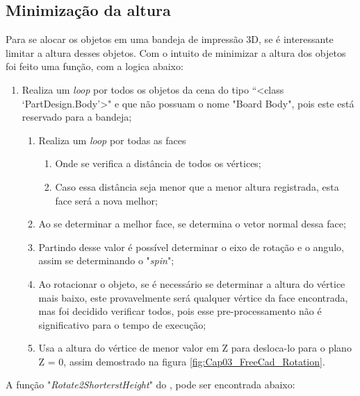 \subsection{Minimização da altura}
Para se alocar os objetos em uma bandeja de impressão 3D, se é interessante limitar a altura desses objetos.\newline
Com o intuito de minimizar a altura dos objetos foi feito uma função, com a logica abaixo: 
\begin{enumerate}
    \item Realiza um \textit{loop} por todos os objetos da cena do tipo ``<class `PartDesign.Body'>" e que não possuam o nome "Board Body", pois este está reservado para a bandeja;
    \begin{enumerate}
        \item Realiza um \textit{loop} por todas as faces
        \begin{enumerate}
            \item Onde se verifica a distância de todos os vértices;
            \item Caso essa distância seja menor que a menor altura registrada, esta face será a nova melhor;
        \end{enumerate}
        \item Ao se determinar a melhor face, se determina o vetor normal dessa face;
        \item Partindo desse valor é possível determinar o eixo de rotação e o angulo, assim se determinando o "\textit{spin}";
        \item Ao rotacionar o objeto, se é necessário se determinar a altura do vértice mais baixo, este provavelmente será qualquer vértice da face encontrada, mas foi decidido verificar todos, pois esse pre-processamento não é significativo para o tempo de execução;
        \item Usa a altura do vértice de menor valor em Z para desloca-lo para o plano Z = 0, assim demostrado na figura \ref{fig:Cap03_FreeCad_Rotation}.
    \end{enumerate}
\end{enumerate}

A função "\textit{Rotate2ShorterstHeight}" do \cite{code:FreeCad_Miner}, pode ser encontrada abaixo:

